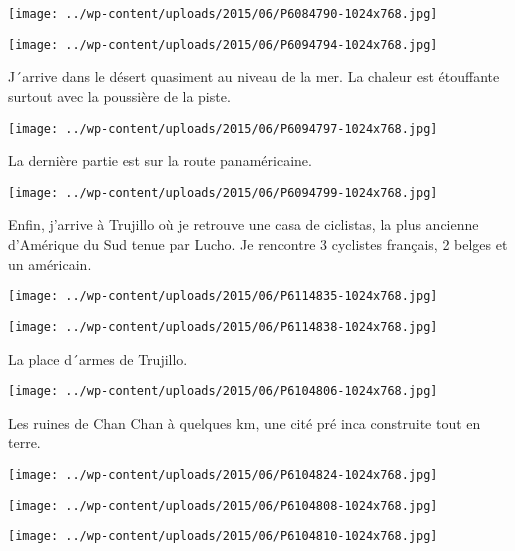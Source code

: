  \newline
\centerline{\texttt{[image: ../wp-content/uploads/2015/06/P6084790-1024x768.jpg]} } 
 \newline
 \newline
\centerline{\texttt{[image: ../wp-content/uploads/2015/06/P6094794-1024x768.jpg]} } 
 \newline
 J´arrive dans le désert quasiment au niveau de la mer. La chaleur est étouffante surtout avec la poussière de la piste. \newline
 \newline
\centerline{\texttt{[image: ../wp-content/uploads/2015/06/P6094797-1024x768.jpg]} } 
 \newline
 La dernière partie est sur la route panaméricaine. \newline
 \newline
\centerline{\texttt{[image: ../wp-content/uploads/2015/06/P6094799-1024x768.jpg]} } 
 \newline
 Enfin, j'arrive à Trujillo où je retrouve une casa de ciclistas, la plus ancienne d'Amérique du Sud tenue par Lucho. Je rencontre 3 cyclistes français, 2 belges et un américain. \newline
 \newline
\centerline{\texttt{[image: ../wp-content/uploads/2015/06/P6114835-1024x768.jpg]} } 
 \newline
 \newline
\centerline{\texttt{[image: ../wp-content/uploads/2015/06/P6114838-1024x768.jpg]} } 
 \newline
 La place d´armes de Trujillo. \newline
 \newline
\centerline{\texttt{[image: ../wp-content/uploads/2015/06/P6104806-1024x768.jpg]} } 
 \newline
 Les ruines de Chan Chan à quelques km, une cité pré inca construite tout en terre. \newline
 \newline
\centerline{\texttt{[image: ../wp-content/uploads/2015/06/P6104824-1024x768.jpg]} } 
 \newline
 \newline
\centerline{\texttt{[image: ../wp-content/uploads/2015/06/P6104808-1024x768.jpg]} } 
 \newline
 \newline
\centerline{\texttt{[image: ../wp-content/uploads/2015/06/P6104810-1024x768.jpg]} } 
